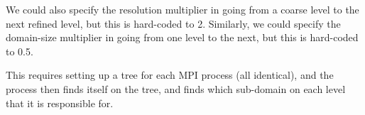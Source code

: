 \documentclass[a4paper,11pt]{article}
\begin{document}
We could also specify the resolution multiplier in going from a coarse level to the next refined level, but this is hard-coded to 2.
Similarly, we could specify the domain-size multiplier in going from one level to the next, but this is hard-coded to 0.5.

This requires setting up a tree for each MPI process (all identical), and the process then finds itself on the tree, and finds which sub-domain on each level that it is responsible for.








\end{document}
